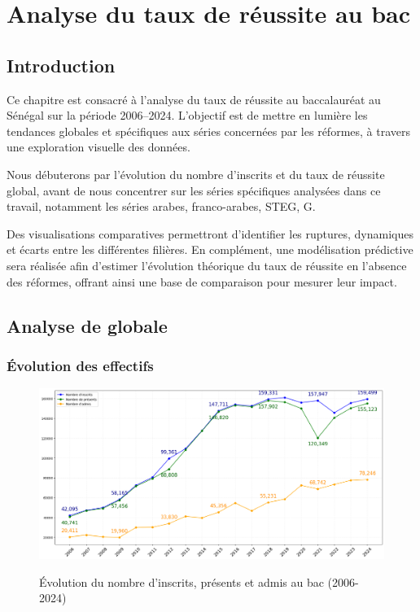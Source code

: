 \chapter{Analyse du taux de réussite au bac}

\section{Introduction}

Ce chapitre est consacré à l’analyse du taux de réussite au baccalauréat au Sénégal sur la période 2006–2024. 
L’objectif est de mettre en lumière les tendances globales et spécifiques aux séries concernées par les réformes, à travers une exploration visuelle des données.

Nous débuterons par l’évolution du nombre d’inscrits et du taux de réussite global, avant de nous concentrer sur les séries spécifiques analysées dans ce travail, notamment les séries arabes, franco-arabes, STEG, G. 

Des visualisations comparatives permettront d’identifier les ruptures, dynamiques et écarts entre les différentes filières. 
En complément, une modélisation prédictive sera réalisée afin d’estimer l’évolution théorique du taux de réussite en l’absence des réformes, offrant ainsi une base de comparaison pour mesurer leur impact.

\section{Analyse de globale}

\newpage
\subsection{Évolution des effectifs}

\begin{figure}[ht]
\centering
\caption{Évolution du nombre d'inscrits, présents et admis au bac (2006-2024)}
\includegraphics[width=1\textwidth]{figure/Inscrits_bac.png}
\label{fig:inscrits_admis}
\end{figure}

